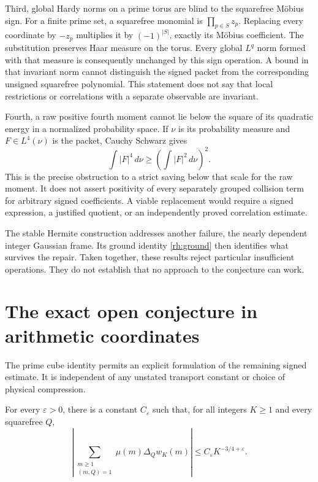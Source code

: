 Third, global Hardy norms on a prime torus are blind to the squarefree Möbius sign. For a finite prime set, a squarefree monomial is \(\prod_{p\in S}z_p\). Replacing every coordinate by \(-z_p\) multiplies it by \((-1)^{|S|}\), exactly its Möbius coefficient. The substitution preserves Haar measure on the torus. Every global \(L^q\) norm formed with that measure is consequently unchanged by this sign operation. A bound in that invariant norm cannot distinguish the signed packet from the corresponding unsigned squarefree polynomial. This statement does not say that local restrictions or correlations with a separate observable are invariant.

Fourth, a raw positive fourth moment cannot lie below the square of its quadratic energy in a normalized probability space. If \(\nu\) is its probability measure and \(F\in L^4(\nu)\) is the packet, Cauchy Schwarz gives
\[
\int |F|^4\,d\nu\ge\left(\int |F|^2\,d\nu\right)^2.
\]
This is the precise obstruction to a strict saving below that scale for the raw moment. It does not assert positivity of every separately grouped collision term for arbitrary signed coefficients. A viable replacement would require a signed expression, a justified quotient, or an independently proved correlation estimate.

The stable Hermite construction addresses another failure, the nearly dependent integer Gaussian frame. Its ground identity \eqref{rh:ground} then identifies what survives the repair. Taken together, these results reject particular insufficient operations. They do not establish that no approach to the conjecture can work.

\section{The exact open conjecture in arithmetic coordinates}

The prime cube identity permits an explicit formulation of the remaining signed estimate. It is independent of any unstated transport constant or choice of physical compression.

\begin{conjecture}\label{rh:signed}
For every \(\varepsilon>0\), there is a constant \(C_\varepsilon\) such that, for all integers \(K\ge1\) and every squarefree \(Q\),
\begin{equation}\label{rh:signedbound}
\left|\sum_{\substack{m\ge1\\(m,Q)=1}}
\mu(m)\Delta_Qw_K(m)\right|
\le C_\varepsilon K^{-3/4+\varepsilon}.
\end{equation}
\end{conjecture}

